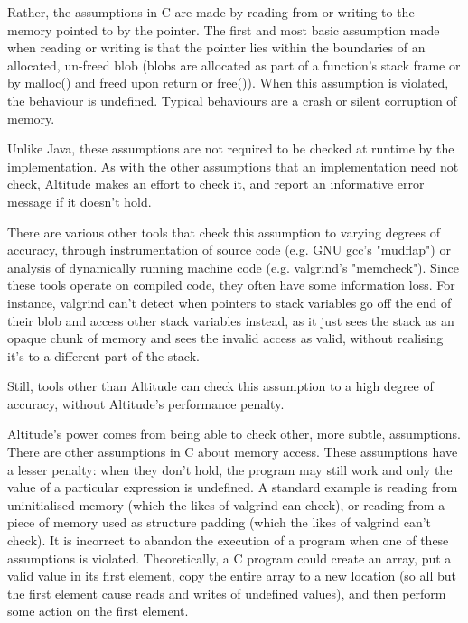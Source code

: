 \documentclass[10pt,a4paper]{report}
\begin{document}
Rather, the assumptions in C are made by reading from or writing to the memory pointed to by the pointer. The first and most basic assumption made when reading or writing is that the pointer lies within the boundaries of an allocated, un-freed blob (blobs are allocated as part of a function's stack frame or by malloc() and freed upon return or free()). When this assumption is violated, the behaviour is undefined. Typical behaviours are a crash or silent corruption of memory.

Unlike Java, these assumptions are not required to be checked at runtime by the implementation. As with the other assumptions that an implementation need not check, Altitude makes an effort to check it, and report an informative error message if it doesn't hold.

There are various other tools that check this assumption to varying degrees of accuracy, through instrumentation of source code (e.g. GNU gcc's "mudflap") or analysis of dynamically running machine code (e.g. valgrind's "memcheck"). Since these tools operate on compiled code, they often have some information loss. For instance, valgrind can't detect when pointers to stack variables go off the end of their blob and access other stack variables instead, as it just sees the stack as an opaque chunk of memory and sees the invalid access as valid, without realising it's to a different part of the stack.

Still, tools other than Altitude can check this assumption to a high degree of accuracy, without Altitude's performance penalty.

Altitude's power comes from being able to check other, more subtle, assumptions. There are other assumptions in C about memory access. These assumptions have a lesser penalty: when they don't hold, the program may still work and only the value of a particular expression is undefined. A standard example is reading from uninitialised memory (which the likes of valgrind can check), or reading from a piece of memory used as structure padding (which the likes of valgrind can't check). It is incorrect to abandon the execution of a program when one of these assumptions is violated. Theoretically, a C program could create an array, put a valid value in its first element, copy the entire array to a new location (so all but the first element cause reads and writes of undefined values), and then perform some action on the first element.
\end{document}
